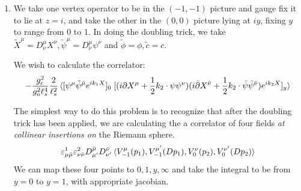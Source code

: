 \documentclass[11pt, class=article, crop=false]{standalone}
\begin{document}
\begin{enumerate}
	Only in the IIB case will $C_{\alpha \beta}$ will be nonzero between $\overline{S}_\alpha$ and $\tilde S_\beta$ since $S_\alpha$ and $\tilde S_\beta$ transform in the same representations. Each $\delta^i$ changes the chirality. So the amplitude in IIB will vanish if we have an odd number of $\delta^i$, equivalently $9-p$ is odd, so we will have only odd $p$ branes in IIB as required and even $p$ branes in IIA as required. 
	
	We thus get an amplitude proportional to:
	\[
		\mathcal A = i \frac{g_c \sdelta^{p+1}}{g_p^2 \ell_s^2} \frac{C_{\mu_0 \dots \mu_p}}{(p+1)!} \Tr(\Gamma^{\mu_0 \dots \mu_p} \Gamma^{p+1} \dots \Gamma^9 \Gamma^{11}) = i \frac{g_c \sdelta^{p+1}}{g_p^2 \ell_s^2} \frac{C_{\mu_0 \dots \mu_p} \epsilon_{(p+1)}^{\mu_0 \dots \mu_p}}{(p+1)!} 
	\]
	Comparing with the \textbf{8.4.4}, which should factorize as $\mathcal A(p_\parallel)^2 G_{9-p}(p_\perp) \delta^{p+1}(p_\parallel)$ we see that the normalization of our on-shell amplitude is in fact:
	\[
		\mathcal A = i V_{p+1} \, \sqrt{2 \pi} (2\pi \ell_s)^{3-p} \frac{C_{\mu_0 \dots \mu_p} \epsilon_{(p+1)}^{\mu_0 \dots \mu_p}}{(p+1)!} 
	\]
	This is consistent with other results c.f. Di Vecchia, Liccardo \emph{Gauge Theories from D-Branes}, arXiv:0307104 but I think they're not incorporating $1/\alpha_p = 2 \kappa_{10}^2$ in the propagator. Taking this factor into account and dividing by it followed by taking a square root gives us an on-shell amplitude of:
	\[
		\mathcal A = i V_{p+1} \frac{1}{(2 \pi \ell_s)^p \ell_s g_s} \frac{C_{\mu_0 \dots \mu_p} \epsilon_{(p+1)}^{\mu_0 \dots \mu_p}}{(p+1)!}  = i V_{p+1} T_p \, C_{p+1} \wedge \epsilon_{(p+1)}.
	\]
	This is exactly what would come from a minimal coupling term of the form $i T_p \int C_{p+1}$.
	
	\item We take one vertex operator to be in the $(-1, -1)$ picture and gauge fix it to lie at $z=i$, and take the other in the $(0, 0)$ picture lying at $iy$, fixing $y$ to range from $0$ to $1$. In doing the doubling trick, we take $\tilde X^\mu = D^\mu_\nu X^\nu, \tilde \psi^\mu = D^\mu_\nu \psi^\nu$ and $\tilde \phi = \phi, \tilde c = c$. 
	
	We wish to calculate the correlator:
	\[
		-\frac{g_c^2}{g_o^2 \ell_s^4} \frac{2}{\ell_s^2} \braket{[\psi^\mu \tilde \psi^{\bar \mu} e^{i k_1 X}]_0\; [(i \partial X^\mu + \frac12 k_2 \cdot \psi \psi^\nu) (i \bar {\partial} X^{\bar \nu} + \frac12 k_2 \cdot \bar \psi \bar \psi^{\bar \nu}) e^{i k_2 X}]_y }
	\]
	
	The simplest way to do this problem is to recognize that after the doubling trick has been applied, we are calculating the a correlator of four fields \emph{at collinear insertions on} the Riemann sphere. 
	\[
		\varepsilon^1_{\mu \bar \mu} \varepsilon^2_{\nu \bar \nu} D^{\bar \mu}_{\mu'} D^{\bar \nu}_{\nu'} \braket{V_{-1}^\mu(p_1), V_{-1}^{\mu'}(D p_1), V_0^\nu(p_2), V_0^{\nu'}(D p_2)}
	\]
	 We can map these four points to $0,1,y, \infty$ and take the integral to be from $y = 0$ to $y = 1$, with appropriate jacobian. 
	 

\end{enumerate}
\end{document}
